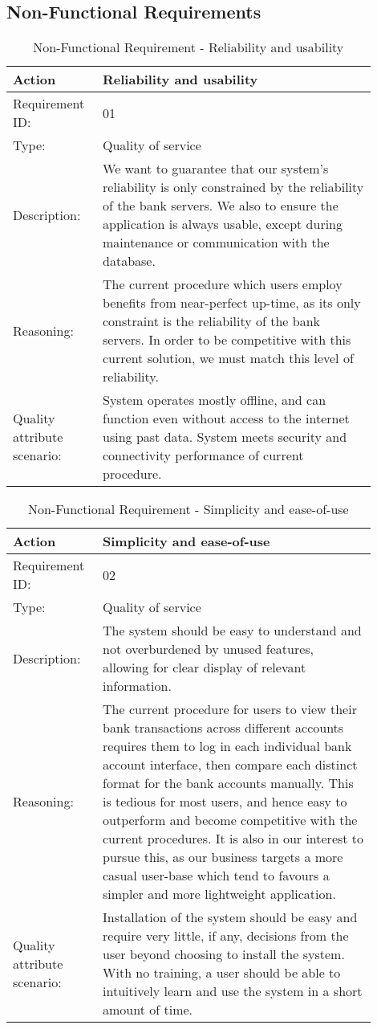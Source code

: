 \documentclass[11pt]{article}
\newcounter{use case ID}
\newcommand\addrow[2]{#1 & #2\\ \hline}
\newcounter{req ID}
\newcommand\tabularheadfsd[1]{
            \begin{table}[ht]
                \addtocounter{req ID}{1}
                \caption{Non-Functional Requirement \arabic{req ID} - #1}
                \vspace{0.2cm}
                \begin{tabular}{|p{0.2\linewidth}|p{0.70\linewidth}|}
                    \hline
                    \textbf{Action} & \textbf{#1} \\
                    \hline}
\newenvironment{requirement}{\tabularheadfsd}
                {\hline\end{tabular}\end{table}}
\begin{document}
\subsection{Non-Functional Requirements}
\begin{requirement}{Reliability and usability}
    \addrow{Requirement ID:}{01}
    \addrow{Type:}{Quality of service}
    \addrow{Description:}{We want to guarantee that our system's reliability is only constrained by the reliability of the bank servers. We also to ensure the application is always usable, except during maintenance or communication with the database.}
    \addrow{Reasoning:}{The current procedure which users employ benefits from near-perfect up-time, as its only constraint is the reliability of the bank servers. In order to be competitive with this current solution, we must match this level of reliability.}
    \addrow{Quality attribute scenario:}{System operates mostly offline, and can function even without access to the internet using past data. System meets security and connectivity performance of current procedure.}
\end{requirement}

\begin{requirement}{Simplicity and ease-of-use}
    \addrow{Requirement ID:}{02}
    \addrow{Type:}{Quality of service}
    \addrow{Description:}{The system should be easy to understand and not overburdened by unused features, allowing for clear display of relevant information.}
    \addrow{Reasoning:}{The current procedure for users to view their bank transactions across different accounts requires them to log in each individual bank account interface, then compare each distinct format for the bank accounts manually. This is tedious for most users, and hence easy to outperform and become competitive with the current procedures. It is also in our interest to pursue this, as our business targets a more casual user-base which tend to favours a simpler and more lightweight application.}
    \addrow{Quality attribute scenario:}{Installation of the system should be easy and require very little, if any, decisions from the user beyond choosing to install the system. With no training, a user should be able to intuitively learn and use the system in a short amount of time.}
\end{requirement}
\end{document}
